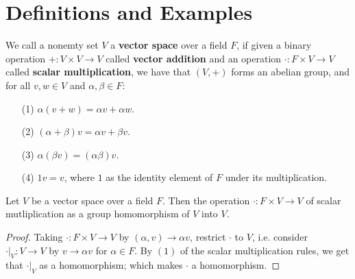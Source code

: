 
\section{Definitions and Examples}
\label{section1}

\begin{definition}
    We call a nonemty set $V$ a \textbf{vector space} over a field $F$, if given
    a binary operation  $+:V \times V \rightarrow V$ called \textbf{vector
    addition} and an operation $\cdot:F \times V \rightarrow V$ called
    \textbf{scalar multiplication}, we have that $(V,+)$ forms an abelian group,
    and for all $v,w \in V$ and  $\alpha,\beta \in F$:
     \begin{enumerate}
         \item[(1)] $\alpha(v+w)=\alpha v+\alpha w$.

         \item[(2)] $ (\alpha+\beta)v=\alpha v+\beta v$.

         \item[(3)] $\alpha(\beta v)=(\alpha\beta)v$.

         \item[(4)] $1v=v$, where  $1$ as the identity element of  $F$ under its
             multiplication.
    \end{enumerate}
\end{definition}

\begin{lemma}\label{2.1.1}
    Let $V$ be a vector space over a field  $F$. Then the operation  $\cdot:F
    \times V \rightarrow V$ of scalar mutliplication as a group homomorphism of
    $V$ into  $V$.
\end{lemma}
\begin{proof}
    Taking $\cdot:F \times V \rightarrow V$ by $(\alpha,v) \rightarrow \alpha
    v$, restrict $\cdot$ to  $V$, i.e. consider $\cdot|_{V}:V \rightarrow V$ by
    $v \rightarrow \alpha v$ for $\alpha \in F$. By $(1)$ of the scalar
    multiplication rules, we get that $\cdot|_{V}$ as a homomorphism; which
    makes $\cdot$ a homomorphism.
\end{proof}

